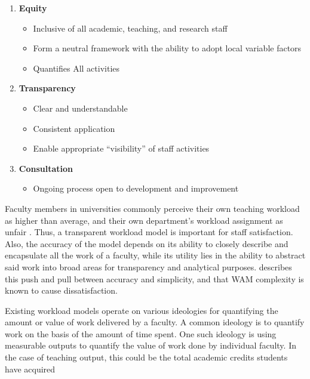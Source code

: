 \begin{enumerate}
    \item \textbf{Equity}

          \begin{itemize}
              \item{Inclusive of all academic, teaching, and research staff}
              \item{Form a neutral framework with the ability to adopt local variable factors}
              \item{Quantifies All activities}
          \end{itemize}
    \item \textbf{Transparency}
          \begin{itemize}
              \item{Clear and understandable}
              \item{Consistent application}
              \item{Enable appropriate “visibility” of staff activities}
          \end{itemize}
    \item \textbf{Consultation}
          \begin{itemize}
              \item{Ongoing process open to development and improvement}
          \end{itemize}
\end{enumerate}

Faculty members in universities commonly perceive their own teaching workload as higher than average, and their own department’s workload assignment as unfair \parencite{2018exploring}. Thus, a transparent workload model is important for staff satisfaction. Also, the accuracy of the model depends on its ability to closely describe and encapsulate all the work of a faculty, while its utility lies in the ability to abstract said work into broad areas for transparency and analytical purposes. \parencite{vardi2009impacts} describes this push and pull between accuracy and simplicity, and that WAM complexity is known to cause dissatisfaction.

Existing workload models operate on various ideologies for quantifying the amount or value of work delivered by a faculty. A common ideology is to quantify work on the basis of the amount of time spent. One such ideology is using measurable outputs to quantify the value of work done by individual faculty. In the case of teaching output, this could be the total academic credits students have acquired \parencite{trac2011}

